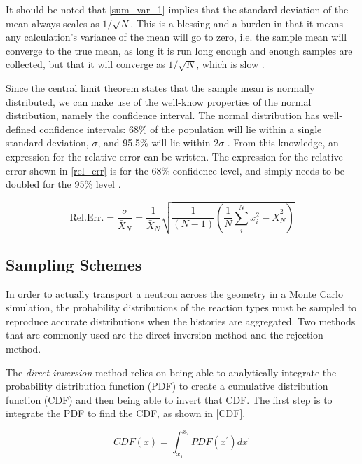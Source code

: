 It should be noted that \eqref{sum_var_1} implies that the standard deviation of the mean always scales as $1/\sqrt{N}$.  This is a blessing and a burden in that it means any calculation's variance of the mean will go to zero, i.e. the sample mean will converge to the true mean, as long it is run long enough and enough samples are collected, but that it will converge as $1/\sqrt{N}$, which is slow \cite{openmc}.

Since the central limit theorem states that the sample mean is normally distributed, we can make use of the well-know properties of the normal distribution, namely the confidence interval.  The normal distribution has well-defined confidence intervals: 68\% of the population will lie within a single standard deviation, $\sigma$, and 95.5\% will lie within $2\sigma$ \cite{jaakko}.  From this knowledge, an expression for the relative error can be written.  The expression for the relative error shown in \eqref{rel_err} is for the 68\% confidence level, and simply needs to be doubled for the 95\% level \cite{mcnp}.

\begin{equation}
\label{rel_err}
\mathrm{Rel. Err.} = \frac{\sigma}{\bar{X}_N} = \frac{1}{\bar{X}_N}\sqrt{\frac{1}{(N-1)} \left( \frac{1}{N}\sum_i^N x_i^2-\bar{X}_N^2 \right)}
\end{equation}

\subsection{Sampling Schemes}

In order to actually transport a neutron across the geometry in a Monte Carlo simulation, the probability distributions of the reaction types must be sampled to reproduce accurate distributions when the histories are aggregated.  Two methods that are commonly used are the direct inversion method and the rejection method.  

The \emph{direct inversion} method relies on being able to analytically integrate the probability distribution function (PDF) to create a cumulative distribution function (CDF) and then being able to invert that CDF.  The first step is to integrate the PDF to find the CDF, as shown in \eqref{CDF}.

\begin{equation}
\label{CDF}
CDF(x) = \int_{x_1}^{x_2} PDF(x^\prime) dx^\prime
\end{equation}

